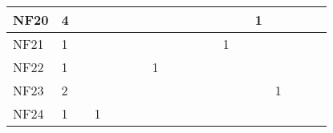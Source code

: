 \begin{table}[]
{\begin{tabular}{|l|l|l|l|l|l|l|l|l|l|l|l|l|l|l|l|l|l|l|}
NF20 & 4                                                     &                                                  &    &    &    &    &                                                  &    &    &    &    &                                                   &    & 1                                                 &    &                                                             &                                                             &                                                             \\ \hline
NF21 & 1                                                     &                                                  &    &    &    &    &                                                  &    &    &    &    & 1                                                 &    &                                                   &    &                                                             &                                                             &                                                             \\ \hline
NF22 & 1                                                     &                                                  &    &    &    &    & 1                                                &    &    &    &    &                                                   &    &                                                   &    &                                                             &                                                             &                                                             \\ \hline
NF23 & 2                                                     &                                                  &    &    &    &    &                                                  &    &    &    &    &                                                   &    &                                                   & 1  &                                                             &                                                             &                                                             \\ \hline
NF24 & 1                                                     &                                                  & 1  &    &    &    &                                                  &    &    &    &    &                                                   &    &                                                   &    &                                                             &                                                             &                                                             \\ \hline

\end{tabular}}
\end{table}

